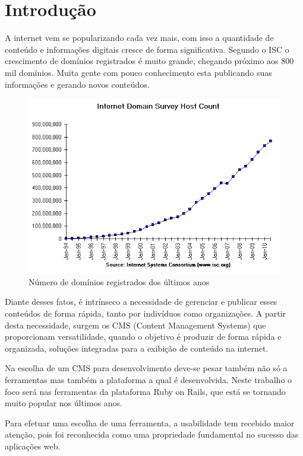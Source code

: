 \chapter{Introdução}

A internet vem se popularizando cada vez mais, com isso a quantidade de conteúdo e informações digitais cresce de forma significativa. Segundo o ISC o crescimento de domínios registrados é muito grande, chegando próximo aos 800 mil domínios. Muita gente com pouco conhecimento esta publicando suas informações e gerando novos conteúdos.

\begin{figure}[here]
\includegraphics[width=150mm]{images/isc_hosts.png}
\caption{Número de domínios registrados dos últimos anos}
\label{fig:isc_hosts.png}
\end{figure}

Diante desses fatos,  é intrínseco a necessidade de gerenciar e publicar esses conteúdos de forma rápida, tanto por indivíduos como organizações. A partir desta necessidade, surgem os CMS (Content Management Systems) que proporcionam versatilidade, quando o objetivo é produzir de forma rápida e organizada, soluções integradas para a exibição de conteúdo na internet. 

Na escolha de um CMS para desenvolvimento deve-se pesar também não só a ferramentas mas também a plataforma a qual é desenvolvida. Neste trabalho o foco será nas ferramentas da plataforma Ruby on Rails, que está se tornando muito popular nos últimos anos.

Para efetuar uma escolha de uma ferramenta, a usabilidade tem recebido maior atenção, pois foi reconhecida como uma propriedade fundamental no sucesso das aplicações web.


